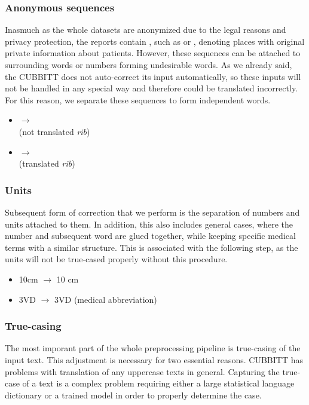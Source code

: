 \subsubsection*{Anonymous sequences}
Inasmuch as the whole datasets are anonymized due to the legal reasons and privacy protection, the reports contain , such as  or \qq{\underline{{ }{ }{ }{ }}}, denoting places with original private information about patients. However, these sequences can be attached to surrounding words or numbers forming undesirable words. As we already said, the CUBBITT does not auto-correct its input automatically, so these inputs will not be handled in any special way and therefore could be translated incorrectly. For this reason, we separate these sequences to form independent words.

\begin{itemize}
	\item {} $\rightarrow$ \\  (not translated \textit{rib})
	\item {} $\rightarrow$ \\  (translated \textit{rib})
\end{itemize}

\subsubsection*{Units}
Subsequent form of correction that we perform is the separation of numbers and units attached to them. In addition, this also includes general cases, where the number and subsequent word are glued together, while keeping specific medical terms with a similar structure. This is associated with the following step, as the units will not be true-cased properly without this procedure.

\begin{itemize}
	\item 10cm $\rightarrow$ 10 cm
	\item 3VD $\rightarrow$ 3VD (medical abbreviation)
\end{itemize}

\subsubsection*{True-casing}
The most imporant part of the whole preprocessing pipeline is true-casing of the input text. This adjustment is necessary for two essential reasons. CUBBITT has problems with translation of any uppercase texts in general. Capturing the true-case of a text is a complex problem requiring either a large statistical language dictionary or a trained model in order to properly determine the case.\\

